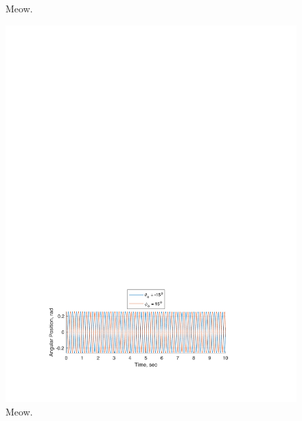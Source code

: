 \documentclass[12pt]{report}
\begin{document}
\begin{flushleft}
\begin{figure}[ht]
  \caption{Meow.}
  \label{fig:+15+15}
\end{figure}
\begin{figure}[ht]
  \includegraphics[center]{2}
  \caption{Meow.}
  \label{fig:-15+15}
\end{figure}
\begin{figure}[ht]

\end{figure}
\end{flushleft}
\end{document}
